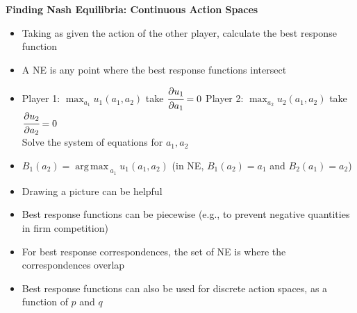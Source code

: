 \documentclass{report}
\newcommand{\FlowerSmall}{\mbox{\raisebox{-1pt}{\small\EightFlowerPetalRemoved}}} %
\DeclareMathOperator*{\argmax}{arg\,max\,} %
\begin{document}
\medskip
\begin{mdframed}
	\medskip
	\begin{center} \textbf{{\large Finding Nash Equilibria: Continuous Action Spaces}}\medskip \end{center}
	\begin{itemize}[label=\FlowerSmall]
		\item{Taking as given the action of the other player, calculate the best response function}
		\item{A NE is any point where the best response functions intersect}
		\item Player 1: $\displaystyle\max_{a_1} u_1(a_1,a_2)$ \hspace{5pt} take $\cfrac{\partial u_1}{\partial a_1} = 0$  \hspace{20pt}
		Player 2: $\displaystyle\max_{a_2} u_2(a_1,a_2)$ \hspace{5pt} take $\cfrac{\partial u_2}{\partial a_2} = 0$\\[5pt]
		Solve the system of equations for $a_1, a_2$
		\item $B_1(a_2) = \displaystyle\argmax_{a_1} u_1(a_1,a_2)$ \hspace{20pt} (in NE, $B_1(a_2) = a_1$ and $B_2(a_1) = a_2$) 
		\item{Drawing a picture can be helpful}
		\item{Best response functions can be piecewise (e.g., to prevent negative quantities in firm competition)}
		\item{For best response correspondences, the set of NE is where the correspondences overlap}
		\item{Best response functions can also be used for discrete action spaces, as a function of $p$ and $q$}
	\end{itemize}
	\smallskip
\end{mdframed}
\newpage
\end{document}
